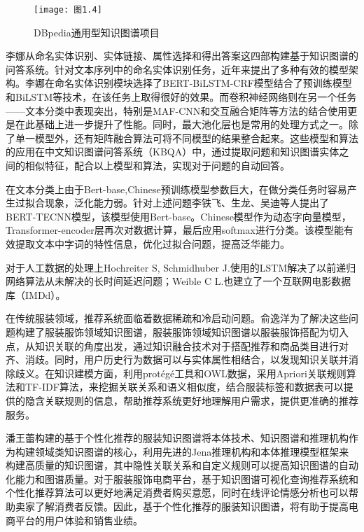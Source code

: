 \documentclass[bachelor_p]{hdu-thesis}
\begin{document}
\begin{figure}[h]
  \centering
  \texttt{[image: 图1.4]}
  \caption{DBpedia通用型知识图谱项目\cite{mastersthesis11}} \label{fig:graph.04}
\end{figure}

李娜从命名实体识别、实体链接、属性选择和得出答案这四部构建基于知识图谱的问答系统。针对文本序列中的命名实体识别任务，近年来提出了多种有效的模型架构。李娜在命名实体识别模块选择了BERT-BiLSTM-CRF模型结合了预训练模型和BiLSTM等技术，在该任务上取得很好的效果。而卷积神经网络则在另一个任务——文本分类中表现突出，特别是MAF-CNN和交互融合矩阵等方法的结合使用更是在此基础上进一步提升了性能。同时，最大池化层也是常用的处理方式之一。除了单一模型外，还有矩阵融合算法可将不同模型的结果整合起来。这些模型和算法的应用在中文知识图谱问答系统（KBQA）中，通过提取问题和知识图谱实体之间的相似特征，配合以上模型和算法，实现对于问题的自动回答\cite{mastersthesis12}。

在文本分类上由于Bert-base,Chinese预训练模型参数巨大，在做分类任务时容易产生过拟合现象，泛化能力弱。针对上述问题李铁飞、生龙、吴迪等人提出了BERT-TECNN模型\cite{article13}，该模型使用Bert-base。Chinese模型作为动态字向量模型，Transformer-encoder层再次对数据计算，最后应用softmax进行分类。该模型能有效提取文本中字词的特性信息，优化过拟合问题，提高泛华能力。

对于人工数据的处理上Hochreiter S, Schmidhuber J.使用的LSTM\cite{article14}解决了以前递归网络算法从未解决的长时间延迟问题；Weible C L.也建立了一个互联网电影数据库（IMDd）\cite{article15}。

在传统服装领域，推荐系统面临着数据稀疏和冷启动问题。俞逸洋为了解决这些问题构建了服装服饰领域知识图谱\cite{mastersthesis16}，服装服饰领域知识图谱以服装服饰搭配为切入点，从知识关联的角度出发，通过知识融合技术对于搭配推荐和商品类目进行对齐、消歧。同时，用户历史行为数据可以与实体属性相结合，以发现知识关联并消除歧义。在知识建模方面，利用protégé工具和OWL数据，采用Apriori关联规则算法和TF-IDF算法，来挖掘关联关系和语义相似度，结合服装标签和数据表可以提供的隐含关联规则的信息，帮助推荐系统更好地理解用户需求，提供更准确的推荐服务。

潘王蕾构建的基于个性化推荐的服装知识图谱\cite{article17}将本体技术、知识图谱和推理机构作为构建领域类知识图谱的核心，利用先进的Jena推理机构和本体推理模型框架来构建高质量的知识图谱，其中隐性关联关系和自定义规则可以提高知识图谱的自动化能力和图谱质量。对于服装服饰电商平台，基于知识图谱可视化查询推荐系统和个性化推荐算法可以更好地满足消费者购买意愿，同时在线评论情感分析也可以帮助卖家了解消费者反馈。因此，基于个性化推荐的服装知识图谱，将有助于提高电商平台的用户体验和销售业绩。
\end{document}
